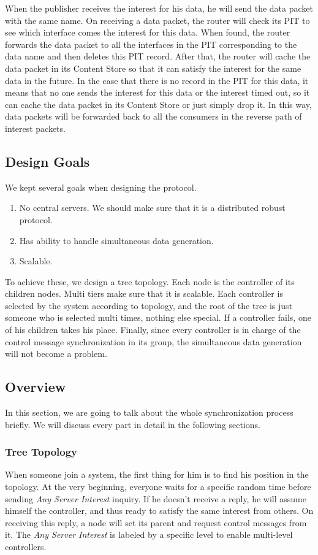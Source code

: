 \documentclass[conference]{IEEEtran}
\begin{document}
When the publisher receives the interest for his data,
he will send the data packet with the same name. On receiving a data packet,
the router will check its PIT to see which interface comes the interest for this data.
When found, the router forwards the data packet to all the interfaces in the PIT
corresponding to the data name and then deletes this PIT record.
After that, the router will cache the data packet in its Content Store
so that it can satisfy the interest for the same data in the future.
In the case that there is no record in the PIT for this data,
it means that no one sends the interest for this data or the interest timed out,
so it can cache the data packet in its Content Store or just simply drop it.
In this way, data packets will be forwarded back to all the consumers in the reverse path of interest packets.

\subsection{Design Goals}
We kept several goals when designing the protocol.
\begin{enumerate}{}
	\item No central servers. We should make sure that it is a distributed robust protocol.
	\item Has ability to handle simultaneous data generation.
	\item Scalable.
\end{enumerate}

To achieve these, we design a tree topology. Each node is the controller of its children nodes.
Multi tiers make sure that it is scalable.
Each controller is selected by the system according to topology,
and the root of the tree is just someone who is selected multi times, nothing else special.
If a controller fails, one of his children takes his place.
Finally, since every controller is in charge of the control message synchronization in its group,
the simultaneous data generation will not become a problem.


\subsection{Overview}

In this section, we are going to talk about the whole synchronization process briefly.
We will discuss every part in detail in the following sections.

\subsubsection{Tree Topology}
When someone join a system, the first thing for him is to find his position in the topology.
At the very beginning,
everyone waits for a specific random time before sending \emph{Any Server Interest} inquiry.
If he doesn't receive a reply, he will assume himself the controller,
and thus ready to satisfy the same interest from others.
On receiving this reply, a node will set its parent and request control messages from it.
The \emph{Any Server Interest} is labeled by a specific level to enable multi-level controllers.
\end{document}
